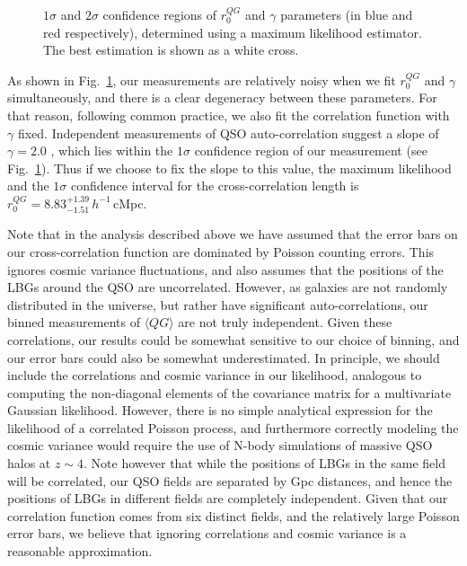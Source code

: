 \documentclass[iop, revtex4]{emulateapj}
\begin{document}
\begin{figure}[t!]
\caption{\label{fig:confidence} $1\sigma$ and  $2\sigma$ confidence regions of $r^{QG}_{0}$ and $\gamma$ parameters (in blue and red respectively), determined using a maximum likelihood estimator. The best estimation is shown as a white cross.\\}
\end{figure} 

As shown in Fig.~\ref{fig:confidence}, our measurements are relatively
noisy when we fit $r^{QG}_{0}$ and $\gamma$ simultaneously, and there
is a clear degeneracy between these parameters. For that reason,
following common practice, we also fit the correlation function with
$\gamma$ fixed.  Independent measurements of QSO auto-correlation suggest a slope
of $\gamma=2.0$ \citep{Shen07}, which lies
within the  $1\sigma$ confidence region of our measurement (see
Fig.~\ref{fig:confidence}). Thus if we choose to fix
the slope to this value, the maximum likelihood and the $1\sigma$
confidence interval for the cross-correlation length is
$r^{QG}_{0}=8.83^{+1.39}_{-1.51}\,h^{-1}$\,cMpc.

Note that in the analysis described above we have assumed that the error
bars on our cross-correlation function are dominated by Poisson counting errors. This
ignores cosmic variance fluctuations, and also assumes that the positions of the LBGs
around the QSO are uncorrelated. However, as galaxies are not randomly distributed in the
universe, but rather have significant auto-correlations, our binned measurements of
$\langle QG\rangle$ are not truly independent. 
Given these correlations, our results could be somewhat sensitive to
our choice of binning, and our error bars could also be somewhat underestimated.
In principle, we should include the 
correlations and cosmic variance in our likelihood, analogous to computing the
non-diagonal elements of the covariance matrix for a multivariate
Gaussian likelihood. However, there is no simple analytical expression
for the likelihood of a correlated Poisson process, and furthermore
correctly modeling the cosmic variance would require the use of N-body
simulations of massive QSO halos at $z\sim4$. Note however that while
the positions of LBGs in the same field will be correlated, our QSO fields
are separated by Gpc distances, and hence the positions of LBGs in
different fields are completely independent. Given that our
correlation function comes from six distinct fields, and the relatively large Poisson
error bars, we believe that ignoring correlations and cosmic variance is a reasonable
approximation.
\end{document}
